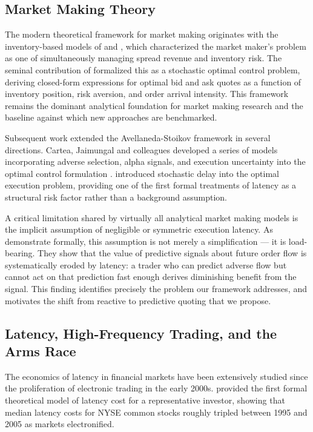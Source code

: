 \documentclass[12pt]{article}
\begin{document}
\subsection{Market Making Theory}

The modern theoretical framework for market making originates with the inventory-based models of \citet{garman1976} and \citet{ho1981}, which characterized the market maker's problem as one of simultaneously managing spread revenue and inventory risk. The seminal contribution of \citet{avellaneda2008} formalized this as a stochastic optimal control problem, deriving closed-form expressions for optimal bid and ask quotes as a function of inventory position, risk aversion, and order arrival intensity. This framework remains the dominant analytical foundation for market making research and the baseline against which new approaches are benchmarked.

Subsequent work extended the Avellaneda-Stoikov framework in several directions. Cartea, Jaimungal and colleagues developed a series of models incorporating adverse selection, alpha signals, and execution uncertainty into the optimal control formulation \citep{cartea2018}. \citet{cartea2023} introduced stochastic delay into the optimal execution problem, providing one of the first formal treatments of latency as a structural risk factor rather than a background assumption.

A critical limitation shared by virtually all analytical market making models is the implicit assumption of negligible or symmetric execution latency. As \citet{lehalle2022} demonstrate formally, this assumption is not merely a simplification --- it is load-bearing. They show that the value of predictive signals about future order flow is systematically eroded by latency: a trader who can predict adverse flow but cannot act on that prediction fast enough derives diminishing benefit from the signal. This finding identifies precisely the problem our framework addresses, and motivates the shift from reactive to predictive quoting that we propose.

\subsection{Latency, High-Frequency Trading, and the Arms Race}

The economics of latency in financial markets have been extensively studied since the proliferation of electronic trading in the early 2000s. \citet{moallemi2013} provided the first formal theoretical model of latency cost for a representative investor, showing that median latency costs for NYSE common stocks roughly tripled between 1995 and 2005 as markets electronified.
\end{document}
